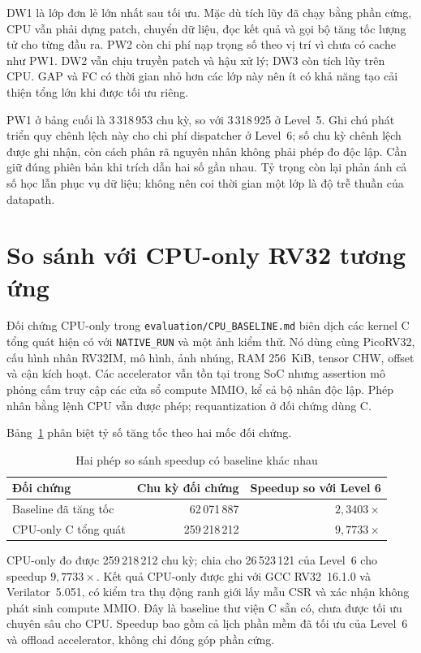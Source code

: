 DW1 là lớp đơn lẻ lớn nhất sau tối ưu. Mặc dù tích lũy đã chạy bằng phần cứng, CPU vẫn phải dựng patch, chuyển dữ liệu, đọc kết quả và gọi bộ tăng tốc lượng tử cho từng đầu ra. PW2 còn chi phí nạp trọng số theo vị trí vì chưa có cache như PW1. DW2 vẫn chịu truyền patch và hậu xử lý; DW3 còn tích lũy trên CPU. GAP và FC có thời gian nhỏ hơn các lớp này nên ít có khả năng tạo cải thiện tổng lớn khi được tối ưu riêng.

PW1 ở bảng cuối là 3\,318\,953 chu kỳ, so với 3\,318\,925 ở Level~5. Ghi chú phát triển quy chênh lệch này cho chi phí dispatcher ở Level~6; số chu kỳ chênh lệch được ghi nhận, còn cách phân rã nguyên nhân không phải phép đo độc lập. Cần giữ đúng phiên bản khi trích dẫn hai số gần nhau. Tỷ trọng còn lại phản ánh cả số học lẫn phục vụ dữ liệu; không nên coi thời gian một lớp là độ trễ thuần của datapath.

\section{So sánh với CPU-only RV32 tương ứng}
Đối chứng CPU-only trong \texttt{evaluation/CPU\_BASELINE.md} biên dịch các kernel C tổng quát hiện có với \texttt{NATIVE\_RUN} và một ảnh kiểm thử. Nó dùng cùng PicoRV32, cấu hình nhân RV32IM, mô hình, ảnh nhúng, RAM 256~KiB, tensor CHW, offset và cận kích hoạt. Các accelerator vẫn tồn tại trong SoC nhưng assertion mô phỏng cấm truy cập các cửa sổ compute MMIO, kể cả bộ nhân độc lập. Phép nhân bằng lệnh CPU vẫn được phép; requantization ở đối chứng dùng C.

Bảng~\ref{tab:speedup-baselines} phân biệt tỷ số tăng tốc theo hai mốc đối chứng.

\begin{table}[!ht]
\renewcommand{\arraystretch}{1.12}
\centering
\caption{Hai phép so sánh speedup có baseline khác nhau}
\label{tab:speedup-baselines}
\begin{tabular}{lrr}
\hline
Đối chứng & Chu kỳ đối chứng & Speedup so với Level 6 \\
\hline
Baseline đã tăng tốc & 62\,071\,887 & $2{,}3403\times$ \\
CPU-only C tổng quát & 259\,218\,212 & $9{,}7733\times$ \\
\hline
\end{tabular}
\end{table}
CPU-only đo được 259\,218\,212 chu kỳ; chia cho 26\,523\,121 của Level~6 cho speedup $9{,}7733\times$. Kết quả CPU-only được ghi với GCC RV32~16.1.0 và Verilator~5.051, có kiểm tra thụ động ranh giới lấy mẫu CSR và xác nhận không phát sinh compute MMIO. Đây là baseline thư viện C sẵn có, chưa được tối ưu chuyên sâu cho CPU. Speedup bao gồm cả lịch phần mềm đã tối ưu của Level~6 và offload accelerator, không chỉ đóng góp phần cứng.

